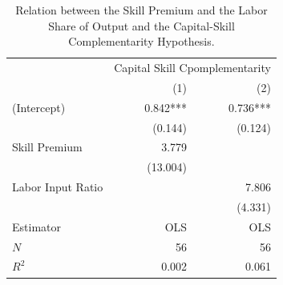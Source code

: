 \documentclass[12pt]{article}
\begin{document}

\begin{table}
 \begin{center}
\begin{tabular}{lrr}
 \toprule
 & \multicolumn{2}{c}{Capital Skill Cpomplementarity} \\
 \cmidrule(lr){2-3} 
 & (1) & (2) \\
 \midrule
 (Intercept) & 0.842*** & 0.736*** \\
 & (0.144) & (0.124) \\
 Skill Premium & 3.779 & \\
 & (13.004) & \\
 Labor Input Ratio & & 7.806 \\
 & & (4.331) \\
 \midrule
 Estimator & OLS & OLS \\
 \midrule
 $N$ & 56 & 56 \\
 $R^2$ & 0.002 & 0.061 \\
 \bottomrule
\end{tabular}
\end{center}
\caption{\label{tab:reg_csc} Relation between the Skill Premium and the Labor Share of Output and the Capital-Skill Complementarity Hypothesis.}
\end{table}
\end{document}
